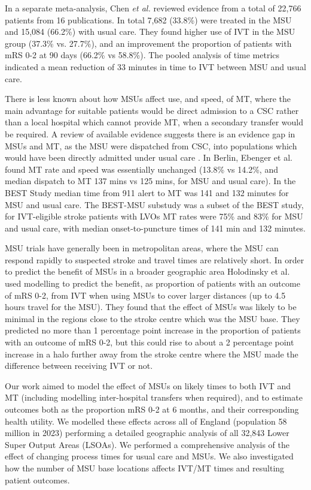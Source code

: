 In a separate meta-analysis, Chen \textit{et al.} \cite{chen_systematic_2022} reviewed evidence from a total of 22,766 patients from 16 publications. In total 7,682 (33.8\%) were treated in the MSU and 15,084 (66.2\%) with usual care. They found higher use of IVT in the MSU group (37.3\% vs. 27.7\%), and an improvement the proportion of patients with mRS 0-2 at 90 days (66.2\% vs 58.8\%).  The pooled analysis of time metrics indicated a mean reduction of 33 minutes in time to IVT between MSU and usual care.

There is less known about how MSUs affect use, and speed, of MT, where the main advantage for suitable patients would be direct admission to a CSC rather than a local hospital which cannot provide MT, when a secondary transfer would be required. A review of available evidence suggests there is an evidence gap in MSUs and MT, as the MSU were dispatched from CSC, into populations which would have been directly admitted under usual care \cite{navi_mobile_2022}. In Berlin, Ebenger et al. \cite{ebinger_association_2021} found MT rate and speed was essentially unchanged (13.8\% vs 14.2\%, and median dispatch to MT 137 mins vs 125 mins, for MSU and usual care). In the BEST Study \cite{grotta_prospective_2021} median time from 911 alert to MT was 141 and 132 minutes for MSU and usual care. The BEST-MSU substudy \cite{czap_abstract_2022} was a subset of the BEST study, for IVT-eligible stroke patients with LVOs MT rates were 75\% and 83\% for MSU and usual care,  with median onset-to-puncture times of 141 min and 132 minutes.


MSU trials have generally been in metropolitan areas, where the MSU can respond rapidly to suspected stroke and travel times are relatively short. In order to predict the benefit of MSUs in a broader geographic area Holodinsky et al. \cite{holodinsky_jessalyn_k_what_2020} used modelling to predict the benefit, as proportion of patients with an outcome of mRS 0-2, from IVT when using MSUs to cover larger distances (up to 4.5 hours travel for the MSU). They found that the effect of MSUs was likely to be  minimal in the regions close to the stroke centre which was the MSU base. They predicted no more than 1 percentage point increase in the proportion of patients with an outcome of mRS 0-2, but this could rise to about a 2 percentage point increase in a halo further away from the stroke centre where the MSU made the difference between receiving IVT or not.


Our work aimed to model the effect of MSUs on likely times to both IVT and MT (including modelling inter-hospital transfers when required), and to estimate outcomes both as the proportion mRS 0-2 at 6 months, and their corresponding health utility. We modelled these effects across  all of England (population 58 million in 2023) performing a detailed geographic analysis of all 32,843 Lower Super Output Areas (LSOAs). We performed a comprehensive analysis of the effect of changing process times for usual care and MSUs. We also investigated how the number of MSU base locations affects IVT/MT times and resulting patient outcomes.